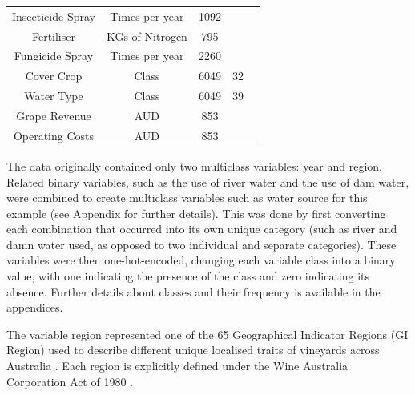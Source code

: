 \documentclass[review,12pt,authoryear]{elsarticle}
\begin{document}
\begin{linenumbers}
\begin{table}[]
\begin{tabular}{@{}ccccl@{}}
  Insecticide Spray & Times per year & 1092 & & \\
  Fertiliser & KGs of Nitrogen & 795 & & \\
  Fungicide Spray & Times per year & 2260 & & \\
  Cover Crop & Class & 6049 & 32 & \\
  Water Type & Class & 6049 & 39 & \\
  Grape Revenue & AUD & 853 & & \\
  Operating Costs & AUD & 853 & & \\ \bottomrule
  \end{tabular}
\end{table}
\normalsize
The data originally contained only two multiclass variables: year and region. Related binary variables, such as the use of river water and the use of dam water, were combined to create multiclass variables such as water source for this example (see Appendix for further details). This was done by first converting each combination that occurred into its own unique category (such as river and damn water used, as opposed to two individual and separate categories). These variables were then one-hot-encoded, changing each variable class into a binary value, with one indicating the presence of the class and zero indicating its absence. Further details about classes and their frequency is available in the appendices.
\par
The variable region represented one of the 65 Geographical Indicator Regions (GI Region) used to describe different unique localised traits of vineyards across Australia \citep{hallidayAustralianWineEncyclopedia2009,oliverReviewSoilPhysical2013,soarClimateDriversRed2008}. Each region is explicitly defined under the Wine Australia Corporation Act of 1980 \citep{attorney-generalsdepartmentWineAustraliaCorporation2010}.
\par


\end{linenumbers}
\end{document}
